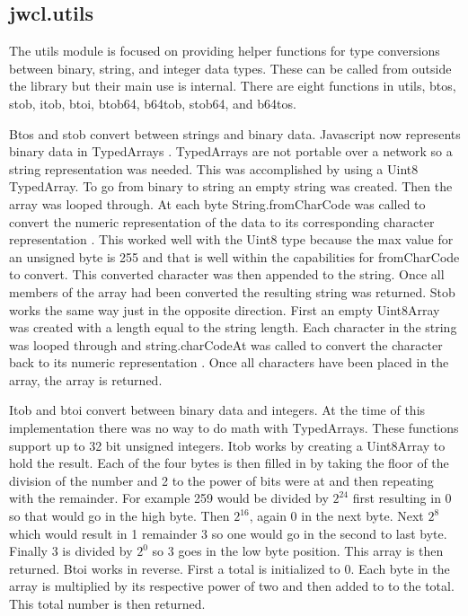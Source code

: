 \subsection{jwcl.utils}


The utils module is focused on providing helper functions for type conversions between binary, string, and integer data types. These can be called from outside the library but their main use is internal. There are eight functions in utils, btos, stob, itob, btoi, btob64, b64tob, stob64, and b64tos.


Btos and stob convert between strings and binary data. Javascript now represents binary data in TypedArrays \cite{mdn-typedarrays}. TypedArrays are not portable over a network so a string representation was needed. This was accomplished by using a Uint8 TypedArray. To go from binary to string an empty string was created. Then the array was looped through. At each byte String.fromCharCode was called to convert the numeric representation of the data to its corresponding character representation \cite{mdn-charfrom}. This worked well with the Uint8 type because the max value for an unsigned byte is 255 and that is well within the capabilities for fromCharCode to convert. This converted character was then appended to the string. Once all members of the array had been converted the resulting string was returned. Stob works the same way just in the opposite direction. First an empty Uint8Array was created with a length equal to the string length. Each character in the string was looped through and string.charCodeAt was called to convert the character back to its numeric representation \cite{mdn-charat}. Once all characters have been placed in the array, the array is returned.


Itob and btoi convert between binary data and integers. At the time of this implementation there was no way to do math with TypedArrays. These functions support up to 32 bit unsigned integers. Itob works by creating a Uint8Array to hold the result. Each of the four bytes is then filled in by taking the floor of the division of the number and 2 to the power of bits were at and then repeating with the remainder. For example 259 would be divided by $2^{24}$ first resulting in 0 so that would go in the high byte. Then $2^{16}$, again 0 in the next byte. Next $2^8$ which would result in 1 remainder 3 so one would go in the second to last byte. Finally 3 is divided by $2^0$ so 3 goes in the low byte position. This array is then returned. Btoi works in reverse. First a total is initialized to 0. Each byte in the array is multiplied by its respective power of two and then added to to the total. This total number is then returned.


